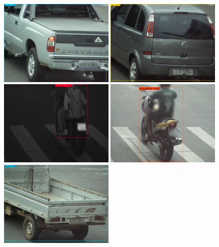 \documentclass[12pt,oneside]{memoir}
\begin{document}
\begin{figure}[htbp]
    \centering
      \includegraphics[width=0.49\textwidth]{matfmaster/yolo/v4/base/car_0.jpg}
      \includegraphics[width=0.49\textwidth]{matfmaster/yolo/v4/base/car_1.jpg}
      \includegraphics[width=0.49\textwidth]{matfmaster/yolo/v4/base/motorbike_0.jpg}
      \includegraphics[width=0.49\textwidth]{matfmaster/yolo/v4/base/motorbike_1.jpg}
      \includegraphics[width=0.49\textwidth]{matfmaster/yolo/v4/base/truck_0.jpg}

\end{figure}
\end{document}
